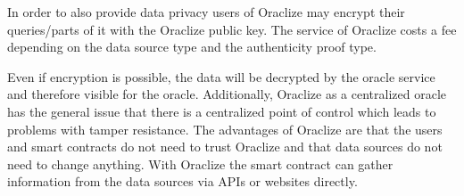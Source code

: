 \documentclass[conference]{IEEEtran}
\begin{document}
In order to also provide data privacy users of Oraclize may encrypt their queries/parts of it with the Oraclize public key. The service of Oraclize costs a fee depending on the data source type and the authenticity proof type. \cite{Oraclize2017} \par
Even if encryption is possible, the data will be decrypted by the oracle service and therefore visible for the oracle. Additionally, Oraclize as a centralized oracle has the general issue that there is a centralized point of control which leads to problems with tamper resistance. \cite{Ellis2017} The advantages of Oraclize are that the users and smart contracts do not need to trust Oraclize and that data sources do not need to change anything. With Oraclize the smart contract can gather information from the data sources via APIs or websites directly. \cite{Oraclize2017} \par    
\end{document}
